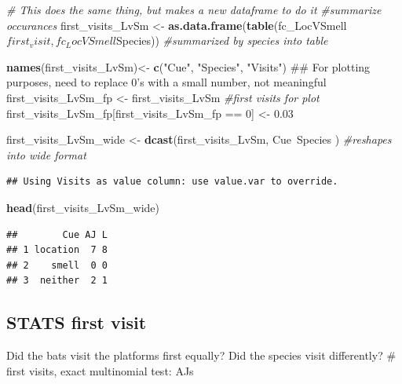 \documentclass[]{article}
\newenvironment{Shaded}{\begin{snugshade}}{\end{snugshade}}
\newcommand{\KeywordTok}[1]{\textcolor[rgb]{0.13,0.29,0.53}{\textbf{{#1}}}}
\newcommand{\DecValTok}[1]{\textcolor[rgb]{0.00,0.00,0.81}{{#1}}}
\newcommand{\FloatTok}[1]{\textcolor[rgb]{0.00,0.00,0.81}{{#1}}}
\newcommand{\StringTok}[1]{\textcolor[rgb]{0.31,0.60,0.02}{{#1}}}
\newcommand{\CommentTok}[1]{\textcolor[rgb]{0.56,0.35,0.01}{\textit{{#1}}}}
\newcommand{\NormalTok}[1]{{#1}}
\begin{document}
\begin{Shaded}
\begin{Highlighting}[]
\CommentTok{# This does the same thing, but makes a new dataframe to do it}
\CommentTok{#summarize occurances}
\NormalTok{first_visits_LvSm <-}\StringTok{ }\KeywordTok{as.data.frame}\NormalTok{(}\KeywordTok{table}\NormalTok{(fc_LocVSmell$first_visit, fc_LocVSmell$Species)) }\CommentTok{#summarized by species into table}



\KeywordTok{names}\NormalTok{(first_visits_LvSm)<-}\StringTok{ }\KeywordTok{c}\NormalTok{(}\StringTok{"Cue"}\NormalTok{, }\StringTok{"Species"}\NormalTok{, }\StringTok{"Visits"}\NormalTok{)}
\NormalTok{## For plotting purposes, need to replace 0's with a small number, not meaningful}
 \NormalTok{first_visits_LvSm_fp <-}\StringTok{ }\NormalTok{first_visits_LvSm }\CommentTok{#first visits for plot}
 \NormalTok{first_visits_LvSm_fp[first_visits_LvSm_fp ==}\StringTok{ }\DecValTok{0}\NormalTok{] <-}\StringTok{ }\FloatTok{0.03} 
 
 
\NormalTok{first_visits_LvSm_wide <-}\StringTok{ }\KeywordTok{dcast}\NormalTok{(first_visits_LvSm, Cue~Species ) }\CommentTok{#reshapes into wide format}
\end{Highlighting}
\end{Shaded}

\begin{verbatim}
## Using Visits as value column: use value.var to override.
\end{verbatim}

\begin{Shaded}
\begin{Highlighting}[]
\KeywordTok{head}\NormalTok{(first_visits_LvSm_wide)}
\end{Highlighting}
\end{Shaded}

\begin{verbatim}
##        Cue AJ L
## 1 location  7 8
## 2    smell  0 0
## 3  neither  2 1
\end{verbatim}

\subsection{STATS first visit}\label{stats-first-visit-1}

Did the bats visit the platforms first equally? Did the species visit
differently? \# first visits, exact multinomial test: AJs
\end{document}
